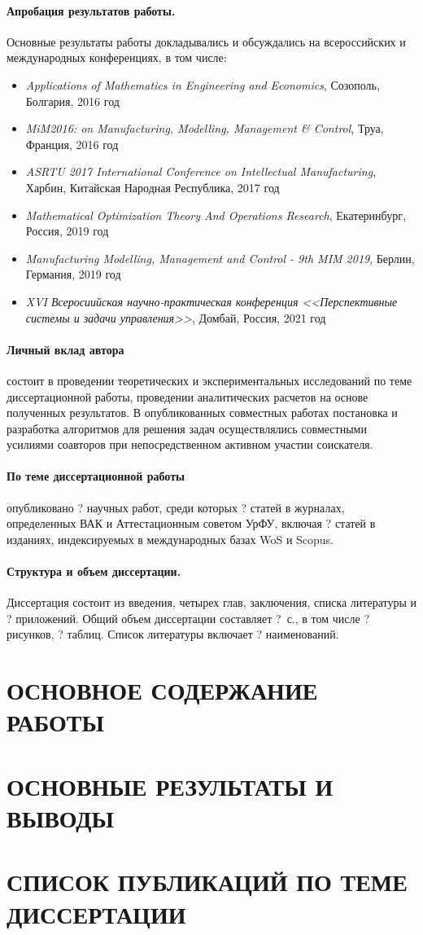 \documentclass[14pt]{extarticle}
\begin{document}
\paragraph*{Апробация результатов работы.}
Основные результаты работы докладывались и обсуждались на всероссийских и международных конференциях, в том числе:

\begin{itemize}
    \item
    \textit{Applications of Mathematics in Engineering and Economics},
    Созополь, Болгария, 2016 год
    \item
    \textit{MiM2016: on Manufacturing, Modelling, Management \& Control},
    Труа, Франция, 2016 год
    \item
    \textit{ASRTU 2017 International Conference on Intellectual Manufacturing},
    Харбин, Китайская Народная Республика, 2017 год
    \item
    \textit{Mathematical Optimization Theory And Operations Research},
    Екатеринбург, Россия, 2019 год
    \item
    \textit{Manufacturing Modelling, Management and Control - 9th MIM 2019},
    Берлин, Германия, 2019 год
    \item
    \textit{XVI Всеросиийская научно-практическая конференция 
    <<Перспективные системы и задачи управления>>},
    Домбай, Россия, 2021 год
\end{itemize}

\paragraph*{Личный вклад автора}
состоит в проведении теоретических и экспериментальных исследований 
по теме диссертационной работы, 
проведении аналитических расчетов на основе полученных результатов.
В опубликованных совместных работах постановка и разработка алгоритмов для
решения задач осуществлялись совместными усилиями соавторов 
при непосредственном активном участии соискателя.

\paragraph*{По теме диссертационной работы}
опубликовано ? научных работ, 
среди которых ? статей в журналах, определенных ВАК и Аттестационным советом УрФУ, 
включая ? статей в изданиях, индексируемых в международных базах WoS и Scopus.

\paragraph*{Структура и объем диссертации.}
Диссертация состоит из введения, 
четырех глав, заключения, списка литературы и ? приложений. 
Общий объем диссертации составляет ?~с., 
в том числе ? рисунков, ? таблиц. 
Список литературы включает ? наименований.

\section*{ОСНОВНОЕ СОДЕРЖАНИЕ РАБОТЫ}

\section*{ОСНОВНЫЕ РЕЗУЛЬТАТЫ И ВЫВОДЫ}

\section*{СПИСОК ПУБЛИКАЦИЙ ПО ТЕМЕ ДИССЕРТАЦИИ}
\end{document}
